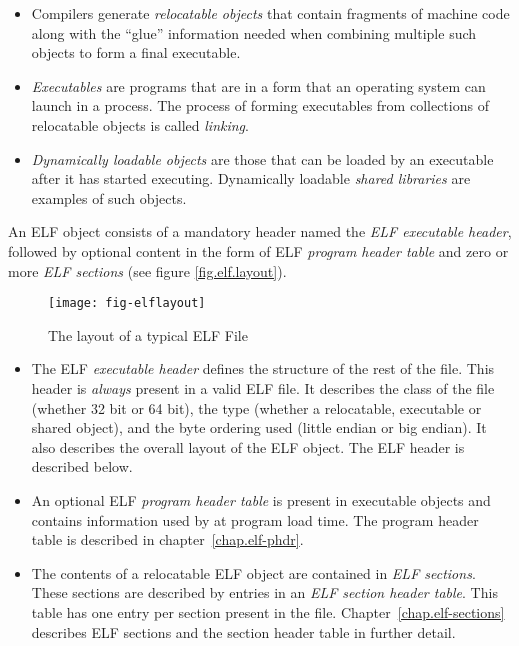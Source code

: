 \documentclass[a4paper,pdftex]{book}
\newcommand{\firstterm}[1]{\textit{#1}}
\begin{document}
\begin{itemize}
\item Compilers generate \firstterm{relocatable
  objects} that contain fragments of
  machine code along with the ``glue'' information needed when
  combining multiple such objects to form a final executable.
\item \firstterm{Executables} are programs that are
  in a form that an operating system can launch in a process.  The
  process of forming executables from collections of relocatable
  objects is called \firstterm{linking}.
\item \firstterm{Dynamically loadable objects} are those that can be loaded by an executable
  after it has started executing.  Dynamically loadable
  \firstterm{shared libraries} are examples of
  such objects.
\end{itemize}

An ELF object consists of a mandatory header named the \firstterm{ELF
  executable header}, followed by optional
content in the form of ELF \firstterm{program header table}
 and zero or more \firstterm{ELF
  sections} (see figure \vref{fig.elf.layout}).

\begin{figure}
  \caption{The layout of a typical ELF File}\label{fig.elf.layout}
  \begin{center}
    \texttt{[image: fig-elflayout]}
  \end{center}
\end{figure}

\begin{itemize}
\item The ELF \firstterm{executable header}
  defines the structure of the rest of the file.  This header is
  \emph{always} present in a valid ELF file.  It describes the class
  of the file (whether 32 bit or 64 bit), the type (whether a
  relocatable, executable or shared object), and the byte ordering
  used (little endian or big endian).  It also describes the overall
  layout of the ELF object.  The ELF header is described below.

\item An optional ELF \firstterm{program header table}
   is present in executable objects and
  contains information used by at program load
  time.  The program header table is
  described in chapter~\vref{chap.elf-phdr}.

\item The contents of a relocatable ELF object are contained in
  \firstterm{ELF sections}.  These sections are
  described by entries in an \firstterm{ELF section header
    table}. This table has one entry
  per section present in the file.  Chapter~\vref{chap.elf-sections}
  describes ELF sections and the section header table in further
  detail.
\end{itemize}
\end{document}
